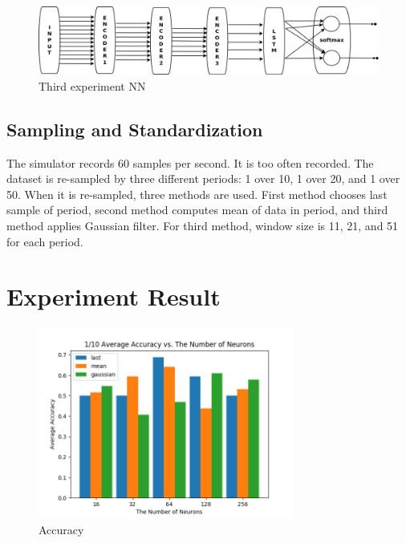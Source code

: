 \documentclass[draft,dvipsnames]{drexel-thesis}
\begin{document}
\begin{thesis}
\begin{figure}[t!]
    \centering
    \includegraphics[width=\textwidth]{pictures/figures/exp_NN3.png}
    \caption{Third experiment NN}
    \label{fig:exp_NN3}
\end{figure}


\section{Sampling and Standardization}
The simulator records 60 samples per second. It is too often recorded. The dataset is re-sampled by three different periods: 1 over 10, 1 over 20, and 1 over 50. When it is re-sampled, three methods are used. First method chooses last sample of period, second method computes mean of data in period, and third method applies Gaussian filter. For third method, window size is 11, 21, and 51 for each period.



\chapter{Experiment Result}


\begin{figure}[H]
    \centering
    \includegraphics[width=0.75\textwidth]{pictures/result_pictures/filtered_1_10_result.png}
    \caption{Accuracy}
    \label{fig:Accuracy}
\end{figure}



\end{thesis}
\end{document}
